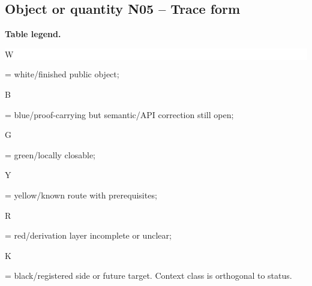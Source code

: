\subsection*{Object or quantity N05 -- Trace form}
\hypertarget{objproof:N05}{}
\par\smallskip\noindent\begin{minipage}{0.99\linewidth}\footnotesize\raggedright\textbf{Table legend.} \colorbox{white}{\strut W} = white/finished public object; \colorbox{cyan!20}{\strut B} = blue/proof-carrying but semantic/API correction still open; \colorbox{green!18}{\strut G} = green/locally closable; \colorbox{yellow!25}{\strut Y} = yellow/known route with prerequisites; \colorbox{red!20}{\strut R} = red/derivation layer incomplete or unclear; \colorbox{black!18}{\strut K} = black/registered side or future target. Context class is orthogonal to status.\end{minipage}\par\vspace{0.25em}
